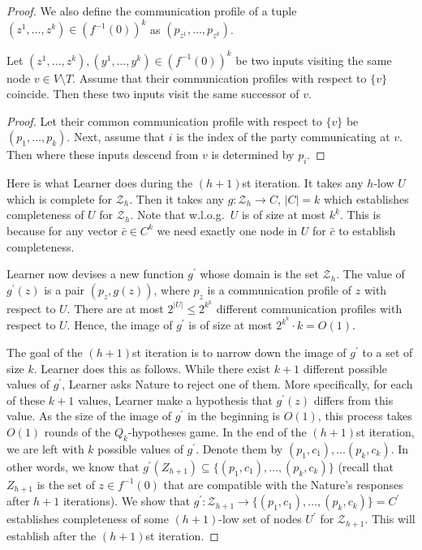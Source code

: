 \documentclass{toc}
\begin{document}
\begin{proof}
We also define the communication profile of a tuple $(z^1, \ldots, z^k) \in (f^{-1}(0))^k$ as $(p_{z^1}, \ldots, p_{z^k})$.

\begin{lemma}
\label{communication_profile_lemma}
Let $(z^1, \ldots, z^k), (y^1, \ldots, y^k)  \in (f^{-1}(0))^k$ be two inputs visiting the same node $v\in V\setminus T$. Assume that their communication profiles with respect to $\{v\}$ coincide. Then these two inputs visit the same successor of $v$. 
\end{lemma}
\begin{proof}
Let their common communication profile with respect to $\{v\}$ be $(p_1, \ldots, p_k)$. Next, assume that $i$ is the index of the party communicating at $v$. Then where these inputs descend from $v$ is determined by $p_i$.
\end{proof}
Here is what Learner does during the $(h + 1)$st iteration. It 
%
 takes any $h$-low $U$ which is complete for $\mathcal{Z}_h$. 
 Then it %
 takes any $g\colon \mathcal{Z}_h\to C$, $|C| = k$ which establishes completeness of $U$ for $\mathcal{Z}_h$. 
 Note that w.l.o.g.~$U$ is of size at most $k^k$. This is because for any vector $\bar{c}\in C^k$ we need exactly one node in $U$ for $\bar{c}$ to establish completeness.

 Learner now devises a new function $g^\prime$ whose domain is the set $\mathcal{Z}_h$. The value of $g^\prime(z)$ is a pair $(p_z, g(z))$, where $p_z$ is a communication profile of $z$ with respect to $U$. There are at most $2^{|U|} \le 2^{k^k}$ different communication profiles with respect to $U$. Hence, the image of $g^\prime$ is of size at most $2^{k^k} \cdot k = O(1)$. 

The goal of the $(h+1)$st iteration is to narrow down the image of $g^\prime$ to a set of size $k$. Learner does this as follows. While there exist $k + 1$ different possible values of $g^\prime$, Learner asks Nature to reject one of them. More specifically, for each of these $k + 1$ values, Learner make a hypothesis that $g^\prime(z)$ differs from this value. As the size of the image of $g^\prime$ in the beginning is $O(1)$, this process takes $O(1)$ rounds of the $Q_k$-hypotheses game. In the end of the $(h+1)$st iteration, we are left with $k$ possible values of $g^\prime$. Denote them by $(p_1, c_1), \ldots (p_k, c_k)$. In other words, we know that $g^\prime(Z_{h+1})\subseteq \{(p_1, c_1), \ldots, (p_k, c_k)\}$ (recall that $Z_{h+1}$ is the set of $z\in f^{-1}(0)$ that are compatible with the Nature's responses after $h + 1$ iterations). We show that $g^\prime\colon \mathcal{Z}_{h  + 1}\to\{(p_1, c_1), \ldots, (p_k, c_k)\} = C^\prime$ establishes completeness of some $(h+1)$-low set of nodes $U^\prime$ for $\mathcal{Z}_{h+1}$. This will establish  after the $(h+1)$st iteration.


\end{proof}
\end{document}
